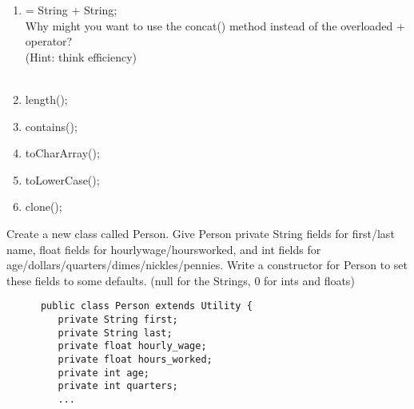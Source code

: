 \documentclass[../../main.tex]{subfiles}
\begin{document}
\begin{steps}
\begin{enumerate}[label=\Alph*.]
      \item \vspace{.5cm}\underline{\hspace{4cm}} = String + String;\\
         Why might you want to use the concat() method instead of the overloaded + operator? \\
         (Hint: think efficiency) \\
         \vspace{.5cm}\\
         \underline{\hspace{15cm}}
      \item \vspace{.5cm}\underline{\hspace{4cm}}length(\underline{\hspace{4cm}});
      \item \vspace{.5cm}\underline{\hspace{4cm}}contains(\underline{\hspace{4cm}});
      \item \vspace{.5cm}\underline{\hspace{4cm}}toCharArray(\underline{\hspace{4cm}});
      \item \vspace{.5cm}\underline{\hspace{4cm}}toLowerCase(\underline{\hspace{4cm}});
      \item \vspace{.5cm}\underline{\hspace{4cm}}clone(\underline{\hspace{4cm}});
   \end{enumerate}
   \pagebreak
      \item Create a new class called Person. Give Person private String fields for first/last 
         name, float fields for hourly\textunderscore wage/hours\textunderscore worked, and
         int fields for age/dollars/quarters/dimes/nickles/pennies. Write a constructor for
         Person to set these fields to some defaults.
         (null for the Strings, 0 for ints and floats)
      \begin{verbatim}
      public class Person extends Utility {
         private String first;
         private String last;
         private float hourly_wage;
         private float hours_worked;
         private int age;
         private int quarters;
         ...


\end{verbatim}
\end{steps}
\end{document}
